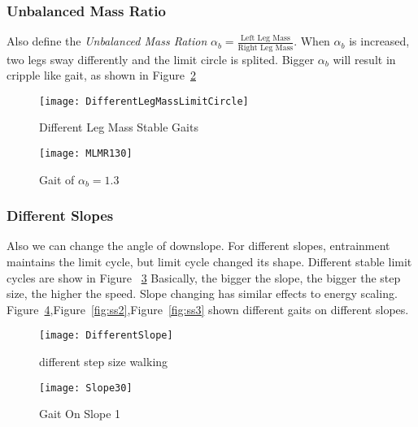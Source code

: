 \subsubsection*{Unbalanced Mass Ratio}
Also define the \emph{Unbalanced Mass Ration} $\alpha_b=\frac{\text{Left Leg Mass}}{\text{Right Leg Mass}}$.
When $\alpha_b$ is increased, two legs sway differently and the limit circle is splited.
Bigger $\alpha_b$  will result in cripple like gait, as shown in Figure~\ref{fig:lm2}

\begin{figure}[!htbp]
  \begin{center}
      \texttt{[image: DifferentLegMassLimitCircle]}
    \caption{Different Leg Mass Stable Gaits}
    \label{fig:differentlr}
\end{center}
\end{figure}




\begin{figure}[!htbp]
  \begin{center}
      \texttt{[image: MLMR130]}
    \caption{Gait of $\alpha_b=1.3$}
    \label{fig:lm2}
\end{center}
\end{figure}



\subsubsection*{Different Slopes}
Also we can change the angle of downslope.
For different slopes, entrainment maintains the limit cycle, but limit cycle changed its shape.
Different stable limit cycles are show in Figure ~\ref{fig:diffslopes}
Basically, the bigger the slope, the bigger the step size, the higher the speed.
Slope changing has similar effects to energy scaling.
Figure~\ref{fig:ss1},Figure~\ref{fig:ss2},Figure~\ref{fig:ss3} shown different gaits on different slopes.


\begin{figure}[!htbp]
  \begin{center}
      \texttt{[image: DifferentSlope]}
    \caption{different step size walking}
    \label{fig:diffslopes}
\end{center}
\end{figure}


\begin{figure}[!htbp]
  \begin{center}
      \texttt{[image: Slope30]}
    \caption{Gait On Slope 1} 
    \label{fig:ss1}
\end{center}
\end{figure}

